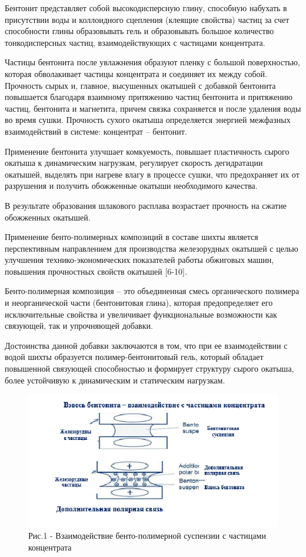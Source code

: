 \begin{multicols}{2}
Бентонит представляет собой высокодисперсную глину, способную набухать в
присутствии воды и коллоидного сцепления (клеящие свойства) частиц за
счет способности глины образовывать гель и образовывать большое
количество тонкодисперсных частиц, взаимодействующих с частицами
концентрата.

Частицы бентонита после увлажнения образуют пленку с большой
поверхностью, которая обволакивает частицы концентрата и соединяет их
между собой. Прочность сырых и, главное, высушенных окатышей с добавкой
бентонита повышается благодаря взаимному притяжению частиц бентонита и
притяжению частиц, бентонита и магнетита, причем связка сохраняется и
после удаления воды во время сушки. Прочность сухого окатыша
определяется энергией межфазных взаимодействий в системе: концентрат --
бентонит.

Применение бентонита улучшает комкуемость, повышает пластичность сырого
окатыша к динамическим нагрузкам, регулирует скорость дегидратации
окатышей, выделять при нагреве влагу в процессе сушки, что предохраняет
их от разрушения и получить обожженные окатыши необходимого качества.

В результате образования шлакового расплава возрастает прочность на
сжатие обожженных окатышей.

Применение бенто-полимерных композиций в составе шихты является
перспективным направлением для производства железорудных окатышей с
целью улучшения технико-экономических показателей работы обжиговых
машин, повышения прочностных свойств окатышей {[}6-10{]}.

Бенто-полимерная композиция -- это объединенная смесь органического
полимера и неорганической части (бентонитовая глина), которая
предопределяет его исключительные свойства и увеличивает функциональные
возможности как связующей, так и упрочняющей добавки.

Достоинства данной добавки заключаются в том, что при ее взаимодействии
с водой шихты образуется полимер-бентонитовый гель, который обладает
повышенной связующей способностью и формирует структуру сырого окатыша,
более устойчивую к динамическим и статическим нагрузкам.

\begin{figure}[H]
	\centering
	\includegraphics[width=\columnwidth]{media/chem2/image61}
	\caption*{Рис.1 - Взаимодействие бенто-полимерной суспензии с частицами концентрата}
\end{figure}


\end{multicols}
